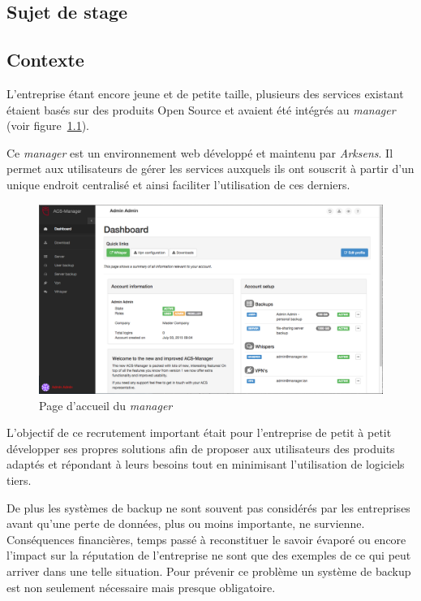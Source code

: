\documentclass[a4paper,10pt, twoside]{report}
\begin{document}
\begin{spacing}{1.2}
\chapter{Sujet de stage}
\thispagestyle{fancy}
\section{Contexte}

L'entreprise étant encore jeune et de petite taille, plusieurs des services
existant étaient basés sur des produits Open Source et avaient été
intégrés au \textit{manager} (voir figure~\ref{managerFront}).

Ce \textit{manager} est un environnement web développé et maintenu par
\textit{Arksens}. Il permet aux utilisateurs de gérer les services auxquels
ils ont souscrit à partir d'un unique endroit centralisé et ainsi
faciliter l'utilisation de ces derniers.

\begin{figure}[h!]
  \centering
  \includegraphics[width=15cm]{produits/manager.png}
  \caption{\label{managerFront} Page d'accueil du \textit{manager}}
\end{figure}

L'objectif de ce recrutement important était pour l'entreprise de petit à
petit développer ses propres solutions afin de proposer aux utilisateurs des
produits adaptés et répondant à leurs besoins tout en minimisant
l'utilisation de logiciels tiers.

De plus les systèmes de backup ne sont souvent pas considérés par les
entreprises avant qu'une perte de données, plus ou moins importante,
ne survienne. Conséquences financières, temps passé à reconstituer le
savoir évaporé ou encore l'impact sur la réputation de l'entreprise ne sont
que des exemples de ce qui peut arriver dans une telle situation. Pour
prévenir ce problème un système de backup est non seulement nécessaire
mais presque obligatoire.


\end{spacing}
\end{document}
